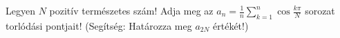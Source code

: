 \documentclass[11pt]{scrartcl}
\begin{document}
Legyen $N$ pozitív természetes szám! Adja meg az
\(
a_n = \frac{1}{n} \sum_{k = 1}^{n} \cos \frac{k \pi}{N}
\)
sorozat torlódási pontjait! (Segítség: Határozza meg $a_{2N}$ értékét!)
\end{document}
